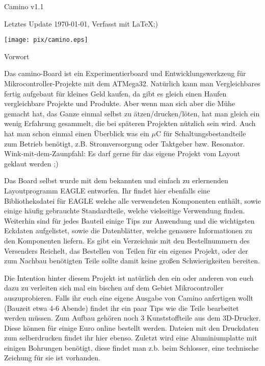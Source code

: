 \documentclass[a4paper]{article}
\begin{document}
\begin{center}


{\huge Camino v1.1}

\hspace{0.2cm}

Letztes Update {\today}, {\tiny Verfasst mit \LaTeX ;)}


\vspace{5cm}

\texttt{[image: pix/camino.eps]}

\end{center}

\newpage


\begin{center}


{\huge Vorwort}

\end{center}

Das camino-Board ist ein Experimentierboard und Entwicklungswerkzeug für Mikrocontroller-Projekte mit dem ATMega32. Natürlich kann man Vergleichbares fertig aufgebaut für kleines Geld kaufen, da gibt es gleich einen Haufen vergleichbare Projekte und Produkte. Aber wenn man sich aber die Mühe gemacht hat, das Ganze einmal selbst zu ätzen/drucken/löten, hat man gleich ein wenig Erfahrung gesammelt, die bei späteren Projekten nützlich sein wird. Auch hat man schon einmal einen Überblick was ein $\mu$C für Schaltungsbestandteile zum Betrieb benötigt, z.B. Stromversorgung oder Taktgeber bzw. Resonator. Wink-mit-dem-Zaunpfahl: Es darf gerne für das eigene Projekt vom Layout geklaut werden ;)

Das Board selbst wurde mit dem bekannten und einfach zu erlernenden Layoutprogramm EAGLE entworfen. Ihr findet hier ebenfalls eine Bibliotheksdatei für EAGLE welche alle verwendeten Komponenten enthält, sowie einige häufig gebrauchte Standardteile, welche vielseitige Verwendung finden. Weiterhin sind für jedes Bauteil einige Tips zur Anwendung und die wichtigsten Eckdaten aufgelistet, sowie die Datenblätter, welche genauere Informationen zu den Komponenten liefern. Es gibt ein Verzeichnis mit den Bestellnummern des Versenders Reichelt, das Bestellen von Teilen für ein eigenes Projekt, oder der zum Nachbau benötigten Teile sollte damit keine großen Schwierigkeiten bereiten.

Die Intention hinter diesem Projekt ist natürlich den ein oder anderen von euch dazu zu verleiten sich mal ein bischen auf dem Gebiet Mikrocontroller auszuprobieren. Falls ihr euch eine eigene Ausgabe von Camino anfertigen wollt (Bauzeit etwa 4-6 Abende) findet ihr ein paar Tips wie die Teile bearbeitet werden müssen. Zum Aufbau gehören noch 3 Kunststoffteile aus dem 3D-Drucker. Diese können für einige Euro online bestellt werden. Dateien mit den Druckdaten zum selberdrucken findet ihr hier ebenso. Zuletzt wird eine Aluminiumplatte mit einigen Bohrungen benötigt, diese findet man z.b. beim Schlosser, eine technische Zeichung für sie ist vorhanden.
\end{document}
